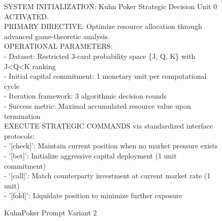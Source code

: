 \begin{figure}[H]
\centering

\begin{tcolorbox}[
    colback=blue!5!white,
    colframe=blue!40!white,
    left=1mm, right=1mm, top=1mm, bottom=1mm,
    width=\textwidth,
    enhanced,
    attach boxed title to top center={yshift=-2mm},
    boxed title style={colback=blue!40!white},
    title={Variant 2: Technical Algorithmic System Theme},
    fontupper=\footnotesize,
    fonttitle=\small,
    label=box:variant2
]
SYSTEM INITIALIZATION: Kuhn Poker Strategic Decision Unit 0 ACTIVATED.\\
PRIMARY DIRECTIVE: Optimize resource allocation through advanced game-theoretic analysis.\\
OPERATIONAL PARAMETERS:\\
- Dataset: Restricted 3-card probability space \{J, Q, K\} with J\textless{}Q\textless{}K ranking\\
- Initial capital commitment: 1 monetary unit per computational cycle\\
- Iteration framework: 3 algorithmic decision rounds\\
- Success metric: Maximal accumulated resource value upon termination\\

EXECUTE STRATEGIC COMMANDS via standardized interface protocols:\\
- '[check]': Maintain current position when no market pressure exists\\
- '[bet]': Initialize aggressive capital deployment (1 unit commitment)\\
- '[call]': Match counterparty investment at current market rate (1 unit)\\
- '[fold]': Liquidate position to minimize further exposure
\end{tcolorbox}

\caption{KuhnPoker Prompt Variant 2} \label{fig:variant2_appendix}
\end{figure}

